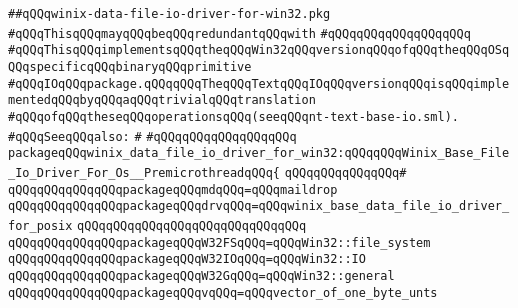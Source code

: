 \label{src/lib/src/lib/thread-kit/src/win32/winix-data-file-io-driver-for-win32.pkg}
\verb|##qQQqwinix-data-file-io-driver-for-win32.pkg|\newline
\newline
\verb|#qQQqThisqQQqmayqQQqbeqQQqredundantqQQqwith|\newline
\verb|#qQQqqQQqqQQqqQQqqQQq|\newline
\newline
\verb|#qQQqThisqQQqimplementsqQQqtheqQQqWin32qQQqversionqQQqofqQQqtheqQQqOSqQQqspecificqQQqbinaryqQQqprimitive|\newline
\verb|#qQQqIOqQQqpackage.qQQqqQQqTheqQQqTextqQQqIOqQQqversionqQQqisqQQqimplementedqQQqbyqQQqaqQQqtrivialqQQqtranslation|\newline
\verb|#qQQqofqQQqtheseqQQqoperationsqQQq(seeqQQqnt-text-base-io.sml).|\newline
\newline
\verb|#qQQqSeeqQQqalso:|\newline
\verb|#|\newline
\verb|#qQQqqQQqqQQqqQQqqQQq|\newline
\newline
\verb|packageqQQqwinix_data_file_io_driver_for_win32:qQQqqQQqWinix_Base_File_Io_Driver_For_Os__PremicrothreadqQQq{|\newline
\verb|qQQqqQQqqQQqqQQq#|\newline
\verb|qQQqqQQqqQQqqQQqpackageqQQqmdqQQq=qQQqmaildrop|\newline
\newline
\verb|qQQqqQQqqQQqqQQqpackageqQQqdrvqQQq=qQQqwinix_base_data_file_io_driver_for_posix|\newline
\verb|qQQqqQQqqQQqqQQqqQQqqQQqqQQqqQQq|\newline
\verb|qQQqqQQqqQQqqQQqpackageqQQqW32FSqQQq=qQQqWin32::file_system|\newline
\verb|qQQqqQQqqQQqqQQqpackageqQQqW32IOqQQq=qQQqWin32::IO|\newline
\verb|qQQqqQQqqQQqqQQqpackageqQQqW32GqQQq=qQQqWin32::general|\newline
\newline
\verb|qQQqqQQqqQQqqQQqpackageqQQqvqQQq=qQQqvector_of_one_byte_unts|\newline
